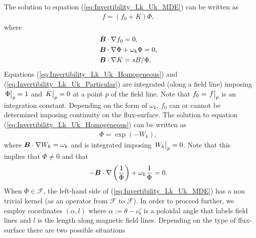 \documentclass[10pt]{iopart}
\begin{document}
The solution to equation (\ref{eq:Invertibility_Lk_Uk_MDE}) can be written as
%
\begin{align}
	f = (f_0 + K ) \Phi,
	\label{eq:Invertibility_Lk_Uk_Variation_of Constants}
\end{align}
where
%
\begin{align}
	& \vb*{B}\cdot \nabla f_0 = 0,  \label{eq:Invertibility_Lk_Uk_constant}
	\\
	& \vb*{B}\cdot \nabla \Phi + \omega_k \Phi = 0,  \label{eq:Invertibility_Lk_Uk_Homogeneous}
	\\
	& \vb*{B}\cdot \nabla K = {sB}/{\Phi}.  \label{eq:Invertibility_Lk_Uk_Particular}
\end{align}
Equations (\ref{eq:Invertibility_Lk_Uk_Homogeneous}) and (\ref{eq:Invertibility_Lk_Uk_Particular}) are integrated (along a field line) imposing $\eval{\Phi}_{p}=1$ and $\eval{K}_{p}=0$ at a point $p$ of the field line. Note that $f_0=\eval{f}_{p}$ is an integration constant. Depending on the form of $\omega_k$, $f_0$ can or cannot be determined imposing continuity on the flux-surface. The solution to equation (\ref{eq:Invertibility_Lk_Uk_Homogeneous}) can be written as
%
\begin{align}
	\Phi = \exp(-W_k), 
	\label{eq:Invertibility_Lk_Uk_Homogeneous_solution}
\end{align}
where $\vb*{B}\cdot\nabla W_k = \omega_k$ and is integrated imposing $\eval{W_k}_{p}=0$. Note that this implies that $\Phi\ne 0$ and that 
\begin{align}
	- \vb*{B}\cdot \nabla \left(\frac{1}{\Phi}\right) + \omega_k \frac{1}{\Phi} = 0.
	\label{eq:Invertibility_Lk_Uk_Adjoint_kernel}
\end{align}
When $\Phi\in\mathcal{F}$, the left-hand side of (\ref{eq:Invertibility_Lk_Uk_MDE}) has a non trivial kernel (as an operator from $\mathcal{F}$ to $\mathcal{F}$). In order to proceed further, we employ coordinates $(\alpha,l)$ where $\alpha:=\theta-\iota \zeta$ is a poloidal angle that labels field lines and $l$ is the length along magnetic field lines. Depending on the type of flux-surface there are two possible situations
%
\end{document}
